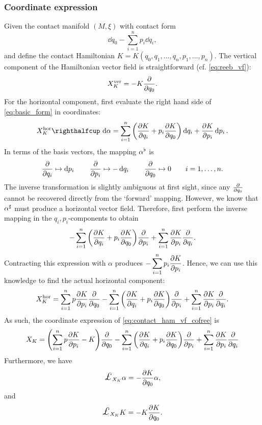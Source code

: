 \subsubsection{Coordinate expression} Given the contact manifold \((M, \xi)\) with contact form
\begin{equation}
     \dd{q_0} - \sum_{i = 1}^n p_i\dd{q_i},
\end{equation}
and define the contact Hamiltonian \(K = K(q_0, q_1, \ldots, q_n, p_1, \ldots, p_n)\). 
The vertical component of the Hamiltonian vector field is straightforward (cf. \cref{eq:reeb_vf}): 
\begin{equation}
     X_K^\text{ver} = -K\pdv{}{q_0}.
\end{equation}
For the horizontal component, first evaluate the right hand side of \cref{eq:basic_form} in coordinates:
\begin{equation}
     \intpr{X_K^\text{hor}}{\dd{\alpha}} =  \sum_{i = 1}^n \qty(\pdv{K}{q_i} + p_i \pdv{K}{q_0})\dd{q_i} + \pdv{K}{p_i}\dd{p_i}.
\end{equation}
In terms of the basis vectors, the mapping \(\alpha^\flat\) is
\begin{equation}
     \pdv{}{q_i} \mapsto \dd{p_i} \qquad \pdv{}{p_i} \mapsto -\dd{q_i} \qquad \pdv{}{q_0} \mapsto 0 \qquad i = 1, \ldots, n.
\end{equation}
The inverse transformation is slightly ambiguous at first sight, since any \(\pdv{}{q_0}\) cannot be recovered directly from the `forward' mapping. However, we know that \(\alpha^\sharp\) must produce a horizontal vector field. Therefore, first perform the inverse mapping in the \(q_i, p_i\)-components to obtain
\begin{equation}
     - \sum_{i = 1}^n \qty(\pdv{K}{q_i} + p_i \pdv{K}{q_0})\pdv{}{p_i} + \sum_{i=1}^n \pdv{K}{p_i}\pdv{}{q_i}.
\end{equation}
Contracting this expression with \(\alpha\) produces \(\displaystyle - \sum_{i=1}^n p_i\pdv{K}{p_i} \). Hence, we can use this knowledge to find the actual horizontal component:
\begin{equation}
     X_K^\text{hor} = \sum_{i=1}^n p\pdv{K}{p_i} \pdv{}{q_0}- \sum_{i = 1}^n \qty(\pdv{K}{q_i} + p_i \pdv{K}{q_0})\pdv{}{p_i} + \sum_{i=1}^n \pdv{K}{p_i}\pdv{}{q_i}.
\end{equation}
As such, the coordinate expression of \cref{eq:contact_ham_vf_cofree} is 
\begin{equation}
    X_K = \qty(\sum_{i=1}^n p\pdv{K}{p_i} - K) \pdv{}{q_0}- \sum_{i = 1}^n \qty(\pdv{K}{q_i} + p_i \pdv{K}{q_0})\pdv{}{p_i} + \sum_{i=1}^n \pdv{K}{p_i}\pdv{}{q_i}
\end{equation}
Furthermore, we have
\begin{equation}
     \lied{X_K} \alpha = - \pdv{K}{q_0} \alpha,
\end{equation} 
and 
\begin{equation}
     \lied{X_K} K = - K\pdv{K}{q_0}.
\end{equation} 

